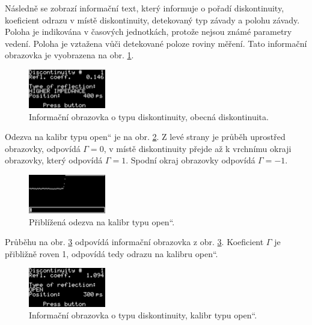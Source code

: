 Následně se zobrazí informační text, který informuje o pořadí diskontinuity, koeficient odrazu v místě diskontinuity, detekovaný typ závady a polohu závady. Poloha je indikována v časových jednotkách, protože nejsou známé parametry vedení. Poloha je vztažena vůči detekované poloze roviny měření. Tato informační obrazovka je vyobrazena na obr. \ref{discontinuity_split}.
\begin{figure}[H]
\includegraphics[width=0.3\textwidth,keepaspectratio,interpolate=false]{images/discontinuity_split.png}\caption{Informační obrazovka o typu diskontinuity, obecná diskontinuita.}\label{discontinuity_split}
\end{figure}

Odezva na kalibr typu \quotedblbase open\textquotedblleft{} je na obr. \ref{discontinuity_open}. Z levé strany je průběh uprostřed obrazovky, odpovídá $\Gamma=0$, v místě diskontinuity přejde až k vrchnímu okraji obrazovky, který odpovídá $\Gamma=1$. Spodní okraj obrazovky odpovídá $\Gamma=-1$.
\begin{figure}[H]
\includegraphics[width=0.3\textwidth,keepaspectratio,interpolate=false]{images/discontinuity_open.png}\caption{Přiblížená odezva na kalibr typu \quotedblbase open\textquotedblleft .}\label{discontinuity_open}
\end{figure}

Průběhu na obr. \ref{discontinuity_open_report} odpovídá informační obrazovka z obr. \ref{discontinuity_open_report}. Koeficient $\Gamma$ je přibližně roven 1, odpovídá tedy odrazu na kalibru \quotedblbase open\textquotedblleft .
\begin{figure}[H]
\includegraphics[width=0.3\textwidth,keepaspectratio,interpolate=false]{images/discontinuity_open_report.png}\caption{Informační obrazovka o typu diskontinuity, kalibr typu \quotedblbase open\textquotedblleft .}\label{discontinuity_open_report}
\end{figure}

